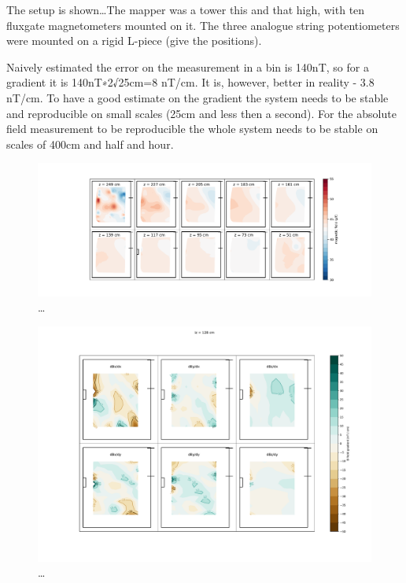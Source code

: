 The setup is shown\ldots The mapper was a tower this and that high, with ten fluxgate magnetometers mounted on it.
The three analogue string potentiometers were mounted on a rigid L-piece (give the positions).

Naively estimated the error on the measurement in a bin is 140nT, so for a gradient it is 140nT∗2√25cm=8 nT/cm. It is, however, better in reality - 3.8 nT/cm. To have a good estimate on the gradient the system needs to be stable and reproducible on small scales (25cm and less then a second). For the absolute field measurement to be reproducible the whole system needs to be stable on scales of 400cm and half and hour.


\begin{figure}
  \centering
  \includegraphics[width=\linewidth]{gfx/mapping/lpsc/bastille_crane_away_rep_magnitude.pdf}
  \caption{\ldots}
  \label{fig:mapping_bastille_magnitude}
\end{figure}

\begin{figure}
  \centering
  \includegraphics[width=\linewidth]{gfx/mapping/lpsc/bastille_crane_away_rep_gradient_139cm.pdf}
  \caption{\ldots}
  \label{fig:mapping_bastille_magnitude}
\end{figure}

